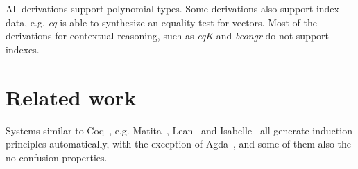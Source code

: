 \documentclass[a4paper,UKenglish,cleveref, autoref]{lipics-v2019}
\newcommand{\derive}[1]{\emph{#1}}
\begin{document}
All derivations support polynomial types.
Some derivations also support index data, e.g. \derive{eq} is able to
synthesize an equality test for vectors. Most of the derivations for
contextual reasoning, such as \derive{eqK} and \derive{bcongr} do not
support indexes.
% 
% 
% 

\section{Related work} %
\label{sec:related}

Systems similar to Coq~\cite{the_coq_development_team_2018_1219885},
e.g. Matita~\cite{10.1007/978-3-642-22438-6_7},
Lean~\cite{10.1007/978-3-319-21401-6_26} and
Isabelle~\cite{Nipkow:2002:IPA:1791547} all generate
induction principles automatically, with the exception of
Agda~\cite{norell:thesis}, and some of them also the no confusion properties. 
\end{document}
